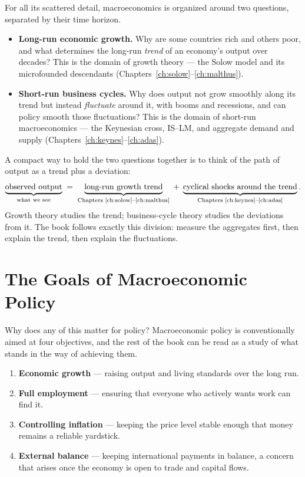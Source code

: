 For all its scattered detail, macroeconomics is organized around two questions, separated by their time horizon.

\begin{itemize}
    \item \textbf{Long-run economic growth.} Why are some countries rich and others poor, and what determines the long-run \emph{trend} of an economy's output over decades? This is the domain of growth theory --- the Solow model and its microfounded descendants (Chapters~\ref{ch:solow}--\ref{ch:malthus}).
    \item \textbf{Short-run business cycles.} Why does output not grow smoothly along its trend but instead \emph{fluctuate} around it, with booms and recessions, and can policy smooth those fluctuations? This is the domain of short-run macroeconomics --- the Keynesian cross, IS--LM, and aggregate demand and supply (Chapters~\ref{ch:keynes}--\ref{ch:adas}).
\end{itemize}

A compact way to hold the two questions together is to think of the path of output as a trend plus a deviation:
\[
\underbrace{\text{observed output}}_{\text{what we see}}
\;=\;
\underbrace{\text{long-run growth trend}}_{\text{Chapters \ref{ch:solow}--\ref{ch:malthus}}}
\;+\;
\underbrace{\text{cyclical shocks around the trend}}_{\text{Chapters \ref{ch:keynes}--\ref{ch:adas}}}.
\]
Growth theory studies the trend; business-cycle theory studies the deviations from it. The book follows exactly this division: measure the aggregates first, then explain the trend, then explain the fluctuations.

\section{The Goals of Macroeconomic Policy}

Why does any of this matter for policy? Macroeconomic policy is conventionally aimed at four objectives, and the rest of the book can be read as a study of what stands in the way of achieving them.

\begin{enumerate}
    \item \textbf{Economic growth} --- raising output and living standards over the long run.
    \item \textbf{Full employment} --- ensuring that everyone who actively wants work can find it.
    \item \textbf{Controlling inflation} --- keeping the price level stable enough that money remains a reliable yardstick.
    \item \textbf{External balance} --- keeping international payments in balance, a concern that arises once the economy is open to trade and capital flows.
\end{enumerate}

